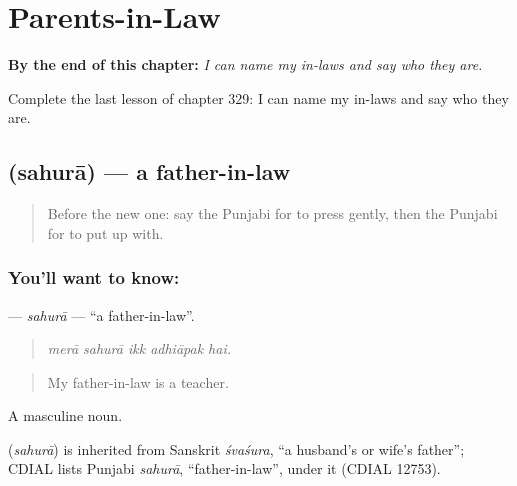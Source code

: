
\chapter{Parents-in-Law}
\label{ch:pa-a2-parents-in-law}

\begin{chapteropening}
\textbf{By the end of this chapter:} \emph{I can name my in-laws and say who they are.}

Complete the last lesson of chapter 329: I can name my in-laws and say who they are.
\end{chapteropening}

\section[\texorpdfstring{\pa{ਸਹੁਰਾ} (sahurā)}{ਸਹੁਰਾ (sahurā)}]{ (sahurā) — a father-in-law}

\label{lesson:PA-C329-sahura}



\begin{quote}
Before the new one: say the Punjabi for to press gently, then the Punjabi for to put up with.
\end{quote}

\subsection*{You'll want to know: }
\textbf{} — \emph{sahurā} — \textquotedblleft{}a father-in-law\textquotedblright{}.

\begin{quote}
    
\end{quote}

\begin{quote}
\emph{merā sahurā ikk adhiāpak hai.}
\end{quote}

\begin{quote}
My father-in-law is a teacher.
\end{quote}

A masculine noun.

\begin{cousinweb}
\textbf{} (\emph{sahurā}) is inherited from Sanskrit \emph{śvaśura}, \textquotedblleft{}a husband's or wife's father\textquotedblright{}; CDIAL lists Punjabi \emph{sahurā}, \textquotedblleft{}father-in-law\textquotedblright{}, under it (CDIAL 12753).
\end{cousinweb}

